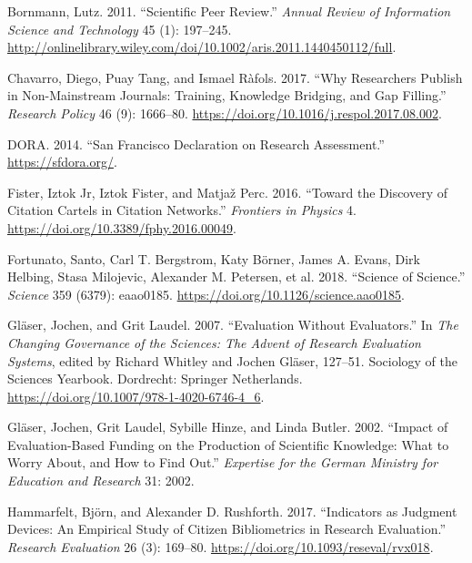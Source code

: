 \documentclass[]{elsarticle} %
\begin{document}
\hypertarget{refs}{}
\leavevmode\hypertarget{ref-bornmannScientificPeerReview2011}{}%
Bornmann, Lutz. 2011. ``Scientific Peer Review.'' \emph{Annual Review of
Information Science and Technology} 45 (1): 197--245.
\url{http://onlinelibrary.wiley.com/doi/10.1002/aris.2011.1440450112/full}.

\leavevmode\hypertarget{ref-chavarroWhyResearchersPublish2017}{}%
Chavarro, Diego, Puay Tang, and Ismael Ràfols. 2017. ``Why Researchers
Publish in Non-Mainstream Journals: Training, Knowledge Bridging, and
Gap Filling.'' \emph{Research Policy} 46 (9): 1666--80.
\url{https://doi.org/10.1016/j.respol.2017.08.002}.

\leavevmode\hypertarget{ref-doraSanFranciscoDeclaration2014}{}%
DORA. 2014. ``San Francisco Declaration on Research Assessment.''
\url{https://sfdora.org/}.

\leavevmode\hypertarget{ref-fisterDiscoveryCitationCartels2016}{}%
Fister, Iztok Jr, Iztok Fister, and Matjaž Perc. 2016. ``Toward the
Discovery of Citation Cartels in Citation Networks.'' \emph{Frontiers in
Physics} 4. \url{https://doi.org/10.3389/fphy.2016.00049}.

\leavevmode\hypertarget{ref-fortunatoScienceScience2018}{}%
Fortunato, Santo, Carl T. Bergstrom, Katy Börner, James A. Evans, Dirk
Helbing, Stasa Milojevic, Alexander M. Petersen, et al. 2018. ``Science
of Science.'' \emph{Science} 359 (6379): eaao0185.
\url{https://doi.org/10.1126/science.aao0185}.

\leavevmode\hypertarget{ref-glaserEvaluationEvaluators2007}{}%
Gläser, Jochen, and Grit Laudel. 2007. ``Evaluation Without
Evaluators.'' In \emph{The Changing Governance of the Sciences: The
Advent of Research Evaluation Systems}, edited by Richard Whitley and
Jochen Gläser, 127--51. Sociology of the Sciences Yearbook. Dordrecht:
Springer Netherlands. \url{https://doi.org/10.1007/978-1-4020-6746-4_6}.

\leavevmode\hypertarget{ref-glaserImpactEvaluationbasedFunding2002}{}%
Gläser, Jochen, Grit Laudel, Sybille Hinze, and Linda Butler. 2002.
``Impact of Evaluation-Based Funding on the Production of Scientific
Knowledge: What to Worry About, and How to Find Out.'' \emph{Expertise
for the German Ministry for Education and Research} 31: 2002.

\leavevmode\hypertarget{ref-hammarfeltIndicatorsJudgmentDevices2017}{}%
Hammarfelt, Björn, and Alexander D. Rushforth. 2017. ``Indicators as
Judgment Devices: An Empirical Study of Citizen Bibliometrics in
Research Evaluation.'' \emph{Research Evaluation} 26 (3): 169--80.
\url{https://doi.org/10.1093/reseval/rvx018}.
\end{document}
